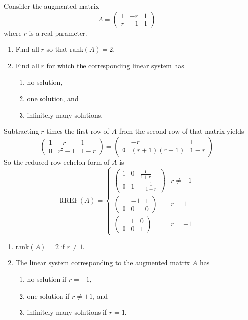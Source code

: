 \documentclass{ximera}
\begin{document}
\begin{exercise}  \label{A:2.4.2}
Consider the augmented matrix 
\[
A=\left(\begin{array}{cc|c}  
 1 & -r & 1\\  
 r & -1 & 1  
\end{array}\right)
\]
where $r$ is a real parameter. 
\begin{enumerate}
\item Find all $r$ so that $\text{rank}(A)=2$.

\item Find all $r$ for which the corresponding linear system has 
\begin{enumerate}
\item no solution, 
\item one solution, and 
\item infinitely many solutions.
\end{enumerate}
\end{enumerate}

\begin{solution}
Subtracting $r$ times the first row of $A$ from the second row of that matrix yields
\[
\left(\begin{array}{cc|c}  
 1 & -r & 1\\  
 0 & r^2-1 & 1-r 
\end{array}\right)=\left(\begin{array}{cc|c}  
 1 & -r & 1\\  
 0 & (r+1)(r-1) & 1-r 
\end{array}\right)
\]
So the reduced row echelon form of $A$ is
\[
\text{RREF}(A)=\begin{cases}
\left(\begin{array}{cc|c}  
 1 & 0 & \frac{1}{1+r}\\  
 0 & 1 & -\frac{1}{1+r}
\end{array}\right) & r\neq \pm 1\\
\left(\begin{array}{cc|c}  
 1 & -1 & 1\\  
 0 & 0 & 0 
\end{array}\right) & r=1\\
\left(\begin{array}{cc|c}  
 1 & 1 & 0\\  
 0 & 0 & 1 
\end{array}\right) & r=-1
\end{cases}
\]
\begin{enumerate}
\item $\text{rank}(A)=2$ if $r\neq 1$.
\item The linear system corresponding to the augmented matrix $A$ has 
\begin{enumerate}
\item no solution if $r=-1$, 
\item one solution if $r\neq \pm 1$, and  
\item infinitely many solutions if $r=1$.
\end{enumerate}
\end{enumerate}
\end{solution}
\end{exercise}
\end{document}
